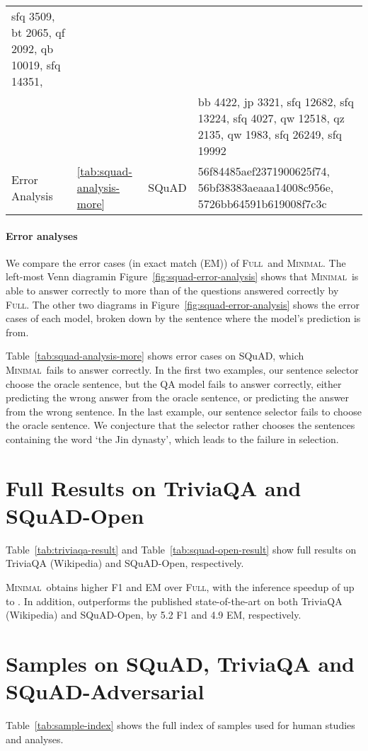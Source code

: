 \documentclass[11pt,a4paper]{article}
\newcommand{\full}{\textsc{Full}}
\newcommand{\ours}{\textsc{Minimal}}
\newcommand{\venndiagram}{Venn diagram}
\newcommand{\reduce}{\vspace*{-3pt}}
\begin{document}
\begin{table*}[!ht]
\begin{center}
{\begin{tabular}{|l|l|l|l|}
 sfq 3509, bt 2065, qf 2092, qb 10019, sfq 14351,\\
&&& bb 4422, jp 3321, sfq 12682, sfq 13224, sfq 4027,
 qw 12518, qz 2135, qw 1983, sfq 26249, sfq 19992\\
 \hline
Error Analysis & \ref{tab:squad-analysis-more} & SQuAD & 56f84485aef2371900625f74, 56bf38383aeaaa14008c956e, 5726bb64591b619008f7c3c \\
 \hline
\end{tabular}
}
\end{center}
\reduce
\caption{QuestionIDs of samples used for human studies and analyses.} 
\label{tab:sample-index}
\end{table*}
 
\paragraph{Error analyses}
We compare the error cases (in exact match (EM)) of \full~and \ours. The left-most \venndiagram in Figure~\ref{fig:squad-error-analysis}  shows that \ours~is able to answer correctly to more than  of the questions answered correctly by \full. The other two diagrams in Figure~\ref{fig:squad-error-analysis}  shows the error cases of each model, broken down by the sentence where the model's prediction is from.

Table~\ref{tab:squad-analysis-more} shows error cases on SQuAD, which \ours~fails to answer correctly. In the first two examples, our sentence selector choose the oracle sentence, but the QA model fails to answer correctly, either predicting the wrong answer from the oracle sentence, or predicting the answer from the wrong sentence. In the last example, our sentence selector fails to choose the oracle sentence. We conjecture that the selector rather chooses the sentences containing the word `the Jin dynasty', which leads to the failure in selection. \section{Full Results on TriviaQA and SQuAD-Open}\label{sec:app-results}Table~\ref{tab:triviaqa-result} and Table~\ref{tab:squad-open-result} show full results on TriviaQA (Wikipedia) and SQuAD-Open, respectively.

\ours~obtains higher F1 and EM over \full, with the inference speedup of up to .
In addition, outperforms the published state-of-the-art on both TriviaQA (Wikipedia) and SQuAD-Open, by 5.2 F1 and 4.9 EM, respectively. \section{Samples on SQuAD, TriviaQA and SQuAD-Adversarial}\label{sec:app-samples}Table~\ref{tab:sample-index} shows the full index of samples used for human studies and analyses.
 
\end{document}
